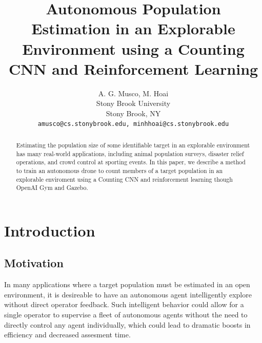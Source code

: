 \documentclass[10pt,twocolumn,letterpaper]{article}
\begin{document}
\title{
  Autonomous Population Estimation in an Explorable Environment using a Counting
  CNN and Reinforcement Learning
}

\author{
  A. G. Musco, M. Hoai\\
  Stony Brook University\\
  Stony Brook, NY\\
  {\tt\small amusco@cs.stonybrook.edu, minhhoai@cs.stonybrook.edu}
}

\maketitle


\begin{abstract}
  Estimating the population size of some identifiable target in an explorable
  environment has many real-world applications, including animal population
  surveys, disaster relief operations, and crowd control at sporting events. In
  this paper, we describe a method to train an autonomous drone to count
  members of a target population in an explorable enviroment using a Counting
  CNN and reinforcement learning though OpenAI Gym and Gazebo.
\end{abstract}


\section{Introduction}

\subsection{Motivation}

  In many applications where a target population must be estimated in an open
  environment, it is desireable to have an autonomous agent intelligently
  explore without direct operator feedback. Such intelligent behavior could
  allow for a single operator to supervise a fleet of autonomous agents without
  the need to directly control any agent individually, which could lead to
  dramatic boosts in efficiency and decreased assesment time.
\end{document}
